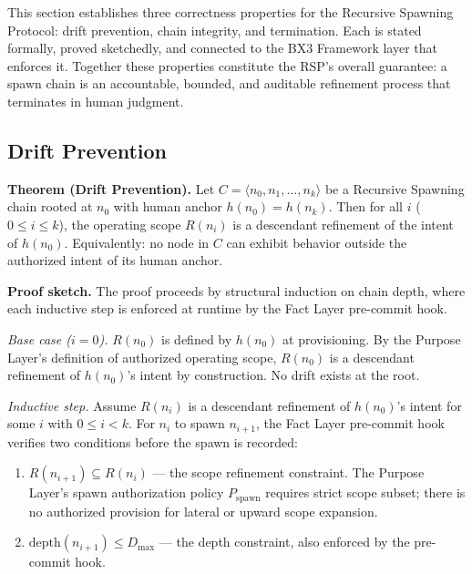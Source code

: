 This section establishes three correctness properties for the Recursive Spawning Protocol: drift prevention, chain integrity, and termination. Each is stated formally, proved sketchedly, and connected to the BX3 Framework layer that enforces it. Together these properties constitute the RSP's overall guarantee: a spawn chain is an accountable, bounded, and auditable refinement process that terminates in human judgment.

\subsection{Drift Prevention}
\label{sec:rs-drift-prevention}

\medskip
\noindent\textbf{Theorem (Drift Prevention).} Let $C = \langle n_0, n_1, \ldots, n_k \rangle$ be a Recursive Spawning chain rooted at $n_0$ with human anchor $h(n_0) = h(n_k)$. Then for all $i$ ($0 \leq i \leq k$), the operating scope $R(n_i)$ is a descendant refinement of the intent of $h(n_0)$. Equivalently: no node in $C$ can exhibit behavior outside the authorized intent of its human anchor.

\medskip
\noindent\textbf{Proof sketch.} The proof proceeds by structural induction on chain depth, where each inductive step is enforced at runtime by the Fact Layer pre-commit hook.

\medskip
\textit{Base case ($i=0$).} $R(n_0)$ is defined by $h(n_0)$ at provisioning. By the Purpose Layer's definition of authorized operating scope, $R(n_0)$ is a descendant refinement of $h(n_0)$'s intent by construction. No drift exists at the root.

\medskip
\textit{Inductive step.} Assume $R(n_i)$ is a descendant refinement of $h(n_0)$'s intent for some $i$ with $0 \leq i < k$. For $n_i$ to spawn $n_{i+1}$, the Fact Layer pre-commit hook verifies two conditions before the spawn is recorded:

\begin{enumerate}
    \item[(a)] $R(n_{i+1}) \subseteq R(n_i)$ --- the scope refinement constraint. The Purpose Layer's spawn authorization policy $P_{\mathrm{spawn}}$ requires strict scope subset; there is no authorized provision for lateral or upward scope expansion.
    \item[(b)] $\mathrm{depth}(n_{i+1}) \leq D_{\mathrm{max}}$ --- the depth constraint, also enforced by the pre-commit hook.
\end{enumerate}

